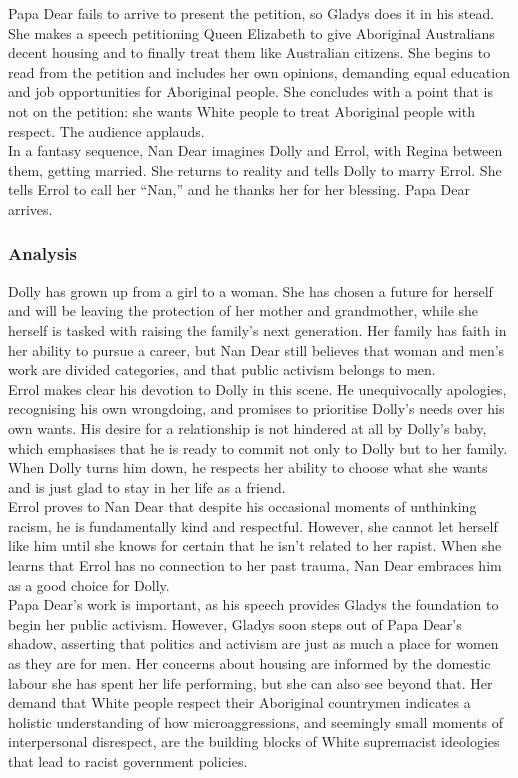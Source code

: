 \documentclass[a4paper]{article}
\begin{document}
Papa Dear fails to arrive to present the petition, so Gladys does
it in his stead. She makes a speech petitioning Queen Elizabeth
to give Aboriginal Australians decent housing and to finally
treat them like Australian citizens. She begins to read from the
petition and includes her own opinions, demanding equal
education and job opportunities for Aboriginal people. She
concludes with a point that is not on the petition: she wants
White people to treat Aboriginal people with respect. The
audience applauds.\\

In a fantasy sequence, Nan Dear imagines Dolly and Errol, with
Regina between them, getting married. She returns to reality
and tells Dolly to marry Errol. She tells Errol to call her “Nan,”
and he thanks her for her blessing. Papa Dear arrives.\\

\subsubsection{Analysis}
Dolly has grown up from a girl to a woman. She has chosen a future
for herself and will be leaving the protection of her mother and
grandmother, while she herself is tasked with raising the family’s
next generation. Her family has faith in her ability to pursue a
career, but Nan Dear still believes that woman and men’s work are
divided categories, and that public activism belongs to men.\\

Errol makes clear his devotion to Dolly in this scene. He
unequivocally apologies, recognising his own wrongdoing, and
promises to prioritise Dolly’s needs over his own wants. His desire
for a relationship is not hindered at all by Dolly’s baby, which
emphasises that he is ready to commit not only to Dolly but to her
family. When Dolly turns him down, he respects her ability to
choose what she wants and is just glad to stay in her life as a friend.\\

Errol proves to Nan Dear that despite his occasional moments of
unthinking racism, he is fundamentally kind and respectful.
However, she cannot let herself like him until she knows for certain
that he isn’t related to her rapist. When she learns that Errol has no
connection to her past trauma, Nan Dear embraces him as a good
choice for Dolly.\\

Papa Dear’s work is important, as his speech provides Gladys the
foundation to begin her public activism. However, Gladys soon steps
out of Papa Dear’s shadow, asserting that politics and activism are
just as much a place for women as they are for men. Her concerns
about housing are informed by the domestic labour she has spent her
life performing, but she can also see beyond that. Her demand that
White people respect their Aboriginal countrymen indicates a
holistic understanding of how microaggressions, and seemingly
small moments of interpersonal disrespect, are the building blocks
of White supremacist ideologies that lead to racist government
policies.\\
\end{document}
